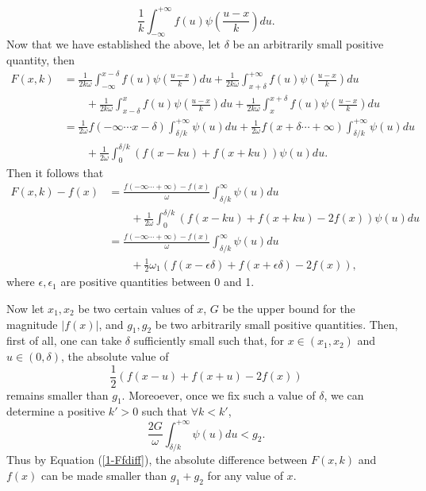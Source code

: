 \documentclass{article}
\begin{document}
\begin{equation*}
\frac{1}{k}\int_{-\infty}^{+\infty} f(u)\psi\left(\frac{u-x}{k}\right)du.
\end{equation*}
Now that we have established the above, let $\delta$ be an arbitrarily small positive quantity, then
\begin{equation*}
\begin{split}
F(x,k)&=\frac{1}{2k\omega}\int_{-\infty}^{x-\delta}f(u)\psi\left(\frac{u-x}{k}\right)du + \frac{1}{2k\omega}\int_{x+\delta}^{+\infty}f(u)\psi\left(\frac{u-x}{k}\right)du\\
&\quad\quad+\frac{1}{2k\omega}\int_{x-\delta}^{x}f(u)\psi\left(\frac{u-x}{k}\right)du + \frac{1}{2k\omega}\int_{x}^{x+\delta}f(u)\psi\left(\frac{u-x}{k}\right)du\\
&=\frac{1}{2\omega}f(-\infty\cdots x-\delta)\int_{\delta/k}^{+\infty}\psi(u)du+\frac{1}{2\omega}f(x+\delta\cdots +\infty)\int_{\delta/k}^{+\infty}\psi(u)du\\
&\quad\quad+\frac{1}{2\omega}\int_{0}^{\delta/k}\left(f(x-ku)+f(x+ku)\right)\psi(u)du.
\end{split}
\end{equation*}
Then it follows that
\begin{equation}\label{1-Ffdiff}
\begin{split}
F(x,k)-f(x)&=\frac{f(-\infty\cdots +\infty)-f(x)}{\omega}\int_{\delta/k}^{\infty}\psi(u)du\\
&\quad\quad +\frac{1}{2\omega}\int_{0}^{\delta/k} \left(f(x-ku)+f(x+ku)-2f(x) \right)\psi(u)du\\
&=\frac{f(-\infty\cdots +\infty)-f(x)}{\omega}\int_{\delta/k}^{\infty}\psi(u)du\\
&\quad\quad +\frac{1}{2}\omega_1 \left(f(x-\epsilon\delta)+f(x+\epsilon\delta)-2f(x) \right),
\end{split}
\end{equation}
where $\epsilon,\epsilon_1$ are positive quantities between 0 and 1.

Now let $x_1,x_2$ be two certain values of $x$, $G$ be the upper bound for the magnitude $|f(x)|$, and $g_1,g_2$ be two arbitrarily small positive quantities. Then, first of all, one can take $\delta$ sufficiently small such that, for $x\in(x_1,x_2)$ and $u\in(0,\delta)$, the absolute value of 
\begin{equation*}
\frac{1}{2}\left(f(x-u)+f(x+u)-2f(x) \right)
\end{equation*}
remains smaller than $g_1$. Moreoever, once we fix such a value of $\delta$, we can determine a positive $k'>0$ such that $\forall k<k'$,
\begin{equation*}
\frac{2G}{\omega}\int_{\delta/k}^{+\infty}\psi(u)du<g_2.
\end{equation*}
Thus by Equation (\ref{1-Ffdiff}), the absolute difference between $F(x,k)$ and $f(x)$ can be made smaller than $g_1+g_2$ for any value of $x$.
\end{document}
